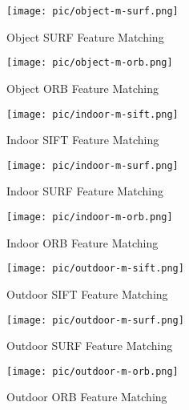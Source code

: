 \documentclass[paper=a4, fontsize=11pt]{scrartcl} %
\numberwithin{equation}{section} %
\numberwithin{figure}{section} %
\numberwithin{table}{section} %
\begin{document}
\begin{figure}[htbp]
\centering
\texttt{[image: pic/object-m-surf.png]}
\caption{Object SURF Feature Matching}
\label{fig:object-m-surf}
\end{figure}

\begin{figure}[htbp]
\centering
\texttt{[image: pic/object-m-orb.png]}
\caption{Object ORB Feature Matching}
\label{fig:object-m-orb}
\end{figure}


\begin{figure}[htbp]
\centering
\texttt{[image: pic/indoor-m-sift.png]}
\caption{Indoor SIFT Feature Matching}
\label{fig:indoor-m-sift}
\end{figure}

\begin{figure}[htbp]
\centering
\texttt{[image: pic/indoor-m-surf.png]}
\caption{Indoor SURF Feature Matching}
\label{fig:indoor-m-surf}
\end{figure}

\begin{figure}[htbp]
\centering
\texttt{[image: pic/indoor-m-orb.png]}
\caption{Indoor ORB Feature Matching}
\label{fig:indoor-m-orb}
\end{figure}



\begin{figure}[htbp]
\centering
\texttt{[image: pic/outdoor-m-sift.png]}
\caption{Outdoor SIFT Feature Matching}
\label{fig:outdoor-m-sift}
\end{figure}

\begin{figure}[htbp]
\centering
\texttt{[image: pic/outdoor-m-surf.png]}
\caption{Outdoor SURF Feature Matching}
\label{fig:outdoor-m-surf}
\end{figure}

\begin{figure}[htbp]
\centering
\texttt{[image: pic/outdoor-m-orb.png]}
\caption{Outdoor ORB Feature Matching}
\label{fig:outdoor-m-orb}
\end{figure}


\end{document}
